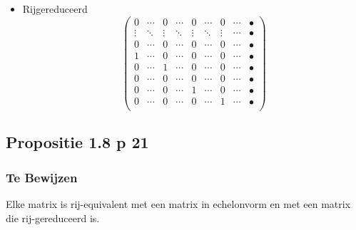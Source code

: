 \documentclass[lineaire_algebra_oplossingen.tex]{subfiles}
\begin{document}
\begin{itemize}
\item Rijgereduceerd
\[
\begin{pmatrix}
0 & \cdots & 0 & \cdots & 0 & \cdots & 0 & \cdots & \bullet\\
\vdots & \ddots & \vdots & \ddots & \vdots & \ddots & \vdots & \cdots & \bullet\\
0 & \cdots & 0 & \cdots & 0 & \cdots & 0 & \cdots & \bullet\\
1 & \cdots & 0 & \cdots & 0 & \cdots & 0 & \cdots & \bullet\\
0 & \cdots & 1 & \cdots & 0 & \cdots & 0 & \cdots & \bullet\\
0 & \cdots & 0 & \cdots & 0 & \cdots & 0 & \cdots & \bullet\\
0 & \cdots & 0 & \cdots & 1 & \cdots & 0 & \cdots & \bullet\\
0 & \cdots & 0 & \cdots & 0 & \cdots & 1 & \cdots & \bullet\\
\end{pmatrix}
\]
\end{itemize}


\subsection{Propositie 1.8 p 21}
\label{1.8}

\subsubsection*{Te Bewijzen}
Elke matrix is rij-equivalent met een matrix in echelonvorm en met een matrix die rij-gereduceerd is.
\end{document}
